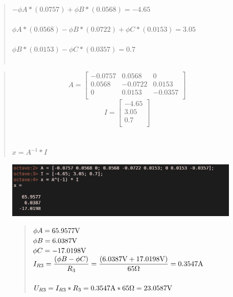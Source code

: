 \begin{quote}
    \medskip
    \medskip
    \centering
    $-\phi A * (0.0757) + \phi B * (0.0568)  = -4.65$ \\~\\ 
    $\phi A * (0.0568) - \phi B * (0.0722) + \phi C * (0.0153)  =3.05$ \\~\\
    $\phi B * (0.0153) - \phi C * (0.0357)  = 0.7    $ \\~\\
\end{quote}


\begin{quote}
    $$ A = 
	\begin{bmatrix} 
	-0.0757 & 0.0568 & 0 \\
	0.0568 & -0.0722 & 0.0153\\
	0 & 0.0153 & -0.0357 \\
	\end{bmatrix}
	\quad
	$$
	$$ I = 
	\begin{bmatrix} 
	-4.65 \\
	3.05\\
	0.7 \\
	\end{bmatrix}
	\quad
	$$
	\\~\\ 
	\medskip
	\centering
	$x = A^{-1} * I$
\end{quote}

\begin{figure}[H]
    \centering
    \includegraphics[scale=0.5]{picturesFor3Uloha/2.png}
    \begin{quote}
        \centering
        $\phi A = 65.9577 \Vo$ \\ 
        $\phi B = 6.0387 \Vo$ \\
        $\phi C = -17.0198 \Vo$ \\ 
        \medskip
        \medskip
         $I_{R3} = \dfrac{(\phi B - \phi C)}{R_3} = \dfrac{( 6.0387\Vo + 17.0198 \Vo)}{65\Omega} = 0.3547\Am$ \\~\\
         $U_{R3} = I_{R3} * R_3 = 0.3547\Am * 65\Omega = 23.0587\Vo$
    \end{quote}
\end{figure}